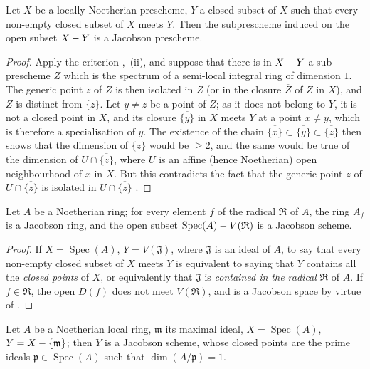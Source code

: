 \begin{proposition}[10.5.7]
\label{IV.10.5.7}
Let $X$ be a locally Noetherian prescheme, $Y$ a closed subset of $X$ such that every non-empty closed subset of $X$ meets $Y$.
Then the subprescheme induced on the open subset $X- Y$ is a Jacobson prescheme.
\end{proposition}

\begin{proof}
Apply the criterion ,~(ii), and suppose that there is in $X- Y$ a sub-prescheme $Z$ which is the spectrum of a semi-local integral ring of dimension $1$. The generic point $z$ of $Z$ is then isolated in $Z$ (or in the closure $\overline{Z}$ of $Z$ in $X$), and $Z$ is distinct from $\{z\}$.
Let $y\neq z$ be a point of $Z$; as it does not belong to $Y$, it is not a closed point in $X$, and its closure $\overline{\{y\}}$ in $X$ meets $Y$ at a point $x\neq y$, which is therefore a specialisation of $y$.
The existence of the chain $\overline{\{x\}}\subset\overline{\{y\}}\subset\overline{\{z\}}$ then shows that the dimension of $\overline{\{z\}}$ would be $\geq 2$, and the same would be true of the dimension of $U\cap\overline{\{z\}}$, where $U$ is an affine (hence Noetherian) open neighbourhood of $x$ in $X$.
But this contradicts the fact that the generic point $z$ of $U\cap\overline{\{z\}}$ is isolated in $U\cap\overline{\{z\}}$ .
\end{proof}

\begin{corollary}[10.5.8]
\label{IV.10.5.8}
Let $A$ be a Noetherian ring; for every element $f$ of the radical $\mathfrak{R}$ of $A$, the ring $A_f$ is a Jacobson ring, and the open subset $\operatorname{Spec}(A)- V(\mathfrak{R})$ is a Jacobson scheme.
\end{corollary}

\begin{proof}
If $X=\operatorname{Spec}(A)$, $Y=V(\mathfrak{J})$, where $\mathfrak{J}$ is an ideal of $A$, to say that every non-empty closed subset of $X$ meets $Y$ is equivalent  to saying that $Y$ contains all the \emph{closed points} of $X$, or equivalently that $\mathfrak{J}$ is \emph{contained in the radical} $\mathfrak{R}$ of $A$.
If $f\in\mathfrak{R}$, the open $D(f)$ does not meet $V(\mathfrak{R})$, and is a Jacobson space by virtue of .
\end{proof}

\begin{corollary}[10.5.9]
\label{IV.10.5.9}
Let $A$ be a Noetherian local ring, $\mathfrak{m}$ its maximal ideal, $X=\operatorname{Spec}(A)$, $Y=X-\{\mathfrak{m}\}$; then $Y$ is a Jacobson scheme, whose closed points are the prime ideals $\mathfrak{p}\in\operatorname{Spec}(A)$ such that $\dim(A/\mathfrak{p})=1$.
\end{corollary}

